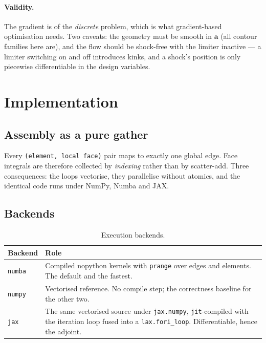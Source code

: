 \documentclass[11pt,a4paper]{article}
\newcommand{\vect}[1]{\boldsymbol{#1}}
\newcommand{\avec}{\vect{a}}
\newcommand{\code}[1]{\texttt{#1}}
\begin{document}
\paragraph{Validity.}  The gradient is of the \emph{discrete} problem, which is
what gradient-based optimisation needs.  Two caveats: the geometry must be smooth
in $\avec$ (all contour families here are), and the flow should be shock-free
with the limiter inactive --- a limiter switching on and off introduces kinks,
and a shock's position is only piecewise differentiable in the design variables.

\section{Implementation}

\subsection{Assembly as a pure gather}

Every \code{(element, local face)} pair maps to exactly one global edge.  Face
integrals are therefore collected by \emph{indexing} rather than by scatter-add.
Three consequences: the loops vectorise, they parallelise without atomics, and
the identical code runs under NumPy, Numba and JAX.

\subsection{Backends}

\begin{table}[H]
  \centering
  \small
  \begin{tabular}{lp{10.6cm}}
    \toprule
    Backend & Role \\
    \midrule
    \code{numba} & Compiled nopython kernels with \code{prange} over edges and
      elements.  The default and the fastest. \\
    \code{numpy} & Vectorised reference.  No compile step; the correctness
      baseline for the other two. \\
    \code{jax}   & The same vectorised source under \code{jax.numpy},
      \code{jit}-compiled with the iteration loop fused into a
      \code{lax.fori\_loop}.  Differentiable, hence the adjoint. \\
    \bottomrule
  \end{tabular}
  \caption{Execution backends.}
\end{table}
\end{document}
